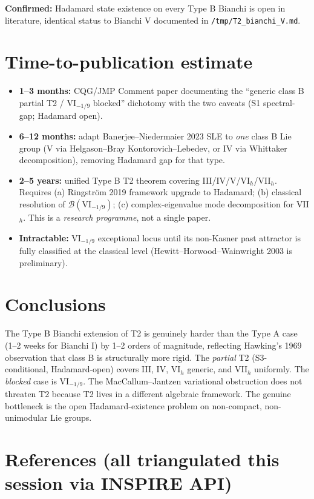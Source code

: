 \documentclass[11pt,a4paper]{article}
\begin{document}
\textbf{Confirmed:} Hadamard state existence on every Type B Bianchi is
open in literature, identical status to Bianchi V documented in
\texttt{/tmp/T2\_bianchi\_V.md}.

\section{Time-to-publication estimate}

\begin{itemize}
\item \textbf{1--3 months:} CQG/JMP Comment paper documenting the
``generic class B partial T2 / VI$_{-1/9}$ blocked'' dichotomy with
the two caveats (S1 spectral-gap; Hadamard open).
\item \textbf{6--12 months:} adapt Banerjee--Niedermaier 2023 SLE to
\emph{one} class B Lie group (V via Helgason--Bray Kontorovich--Lebedev,
or IV via Whittaker decomposition), removing Hadamard gap for that type.
\item \textbf{2--5 years:} unified Type B T2 theorem covering
III/IV/V/VI$_h$/VII$_h$. Requires (a) Ringström 2019 framework
upgrade to Hadamard; (b) classical resolution of $\mathcal{B}(\mathrm{VI}_{-1/9})$;
(c) complex-eigenvalue mode decomposition for VII$_h$. This is a
\emph{research programme}, not a single paper.
\item \textbf{Intractable:} VI$_{-1/9}$ exceptional locus until its
non-Kasner past attractor is fully classified at the classical level
(Hewitt--Horwood--Wainwright 2003 is preliminary).
\end{itemize}

\section{Conclusions}

The Type B Bianchi extension of T2 is genuinely harder than the Type A
case (1--2 weeks for Bianchi I) by 1--2 orders of magnitude, reflecting
Hawking's 1969 observation that class B is structurally more rigid. The
\emph{partial} T2 (S3-conditional, Hadamard-open) covers III, IV, VI$_h$
generic, and VII$_h$ uniformly. The \emph{blocked} case is
VI$_{-1/9}$. The MacCallum--Jantzen variational obstruction does not
threaten T2 because T2 lives in a different algebraic framework. The
genuine bottleneck is the open Hadamard-existence problem on
non-compact, non-unimodular Lie groups.

\section*{References (all triangulated this session via INSPIRE API)}
\end{document}
